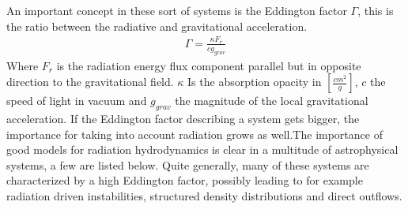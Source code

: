 An important concept in these sort of systems is the Eddington factor $\Gamma$, this is the ratio between the radiative and gravitational acceleration.
\begin{align}
	\Gamma = \frac{\kappa F_r}{c g_{grav}}
\end{align}
Where $F_r$ is the radiation energy flux component parallel but in opposite direction to the gravitational field. $\kappa$ Is the absorption opacity in $[\frac{cm^2}{g}]$, $c$ the speed of light in vacuum and $g_{grav}$ the magnitude of the local gravitational acceleration. If the Eddington factor describing a system gets bigger, the importance for taking into account radiation grows as well.The importance of good models for radiation hydrodynamics is clear in a multitude of astrophysical systems, a few are listed below. Quite generally, many of these systems are characterized by a high Eddington factor, possibly leading to for example radiation driven instabilities, structured density distributions and direct outflows.

